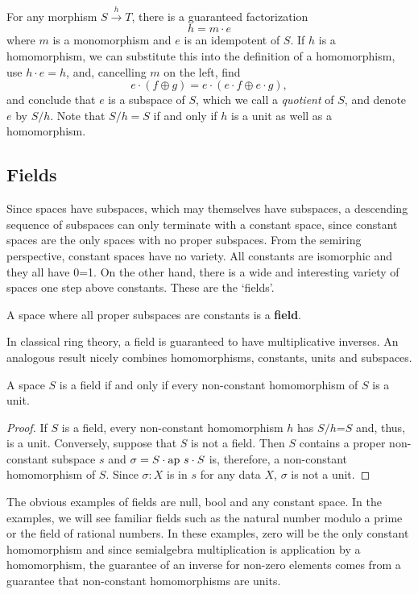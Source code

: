 \documentclass[11pt]{article}
\begin{document}
       For any morphism $S{\overset h \longrightarrow}T$, there is a guaranteed factorization  
\begin{equation}
h = m \cdot e
\end{equation}
where $m$ is a monomorphism and $e$ is an idempotent of $S$.  If $h$ is a homomorphism, we can substitute this into the 
definition of a homomorphism, use $h\cdot e=h$, and, cancelling $m$ on the left, find 
\begin{equation}
e\cdot (f\oplus g) = e\cdot (e\cdot f \oplus e\cdot g),
\end{equation}
and conclude that $e$ is a subspace of $S$, which we call a {\it quotient} of $S$, and denote $e$ by $S/h$.  Note that $S/h=S$ if and only if $h$ is a unit as well as a homomorphism. 

\subsection{Fields}

Since spaces have subspaces, which may themselves have subspaces, a descending sequence of subspaces can only terminate 
with a constant space, since constant spaces are the only spaces with no proper subspaces.  From the semiring perspective, 
constant spaces have no variety.  All constants are isomorphic and they all have 0=1.  On the other hand, there is a wide and 
interesting variety of spaces one step above constants.  These are the `fields'.  
\begin{definition}
A space where all proper subspaces are constants is a {\bf field}.
\end{definition}
\noindent In classical ring theory, a field is guaranteed to have 
multiplicative inverses.  An analogous result nicely combines homomorphisms, constants, units and subspaces.  
\begin{theorem}
A space $S$ is a field if and only if every non-constant homomorphism of $S$ is a unit. 
\end{theorem}

\begin{proof} If $S$ is a field, every non-constant homomorphism $h$ has $S/h$=$S$ and, thus, is a unit.  Conversely, 
suppose that $S$ is not a field.  Then $S$ contains a proper non-constant subspace $s$ and $\sigma = S\cdot {\rm ap}\ s\cdot S$ is,
therefore, a non-constant homomorphism of $S$.  Since $\sigma:X$ is in $s$ for any data $X$, $\sigma$ is not a unit. 
\end{proof}
\noindent 
The obvious examples of fields are null, bool and any constant space.  In the examples, we will see familiar fields such 
as the natural number modulo a prime or the field of rational numbers.  In these examples, zero will be the only constant 
homomorphism and since semialgebra multiplication is application by a homomorphism, the guarantee of an inverse 
for non-zero elements comes from a guarantee that non-constant homomorphisms are units.   
\end{document}

